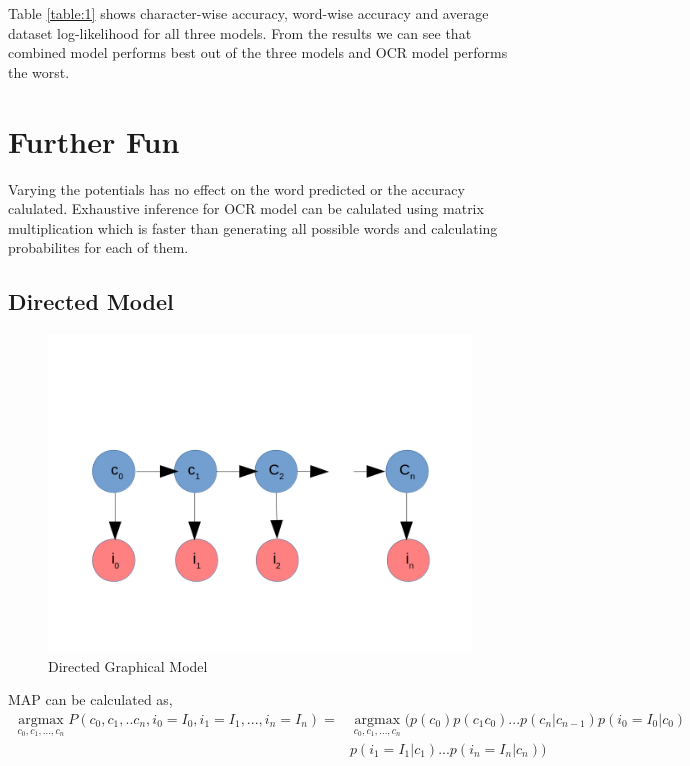 \documentclass[paper=a4, fontsize=11pt]{scrartcl} %
\DeclareMathOperator*{\argmax}{argmax}
\newcommand*{\argmaxl}{\argmax\limits}
\numberwithin{equation}{section} %
\numberwithin{figure}{section} %
\numberwithin{table}{section} %
\begin{document}
Table \ref{table:1} shows character-wise accuracy, word-wise accuracy and average dataset log-likelihood for all three models. From the results we can see that combined model performs best out of the three models and OCR model performs the worst.


\section{Further Fun}

\par

Varying the potentials has no effect on the word predicted or the accuracy calulated. Exhaustive inference for OCR model can be calulated using matrix multiplication which is faster than generating all possible words and calculating probabilites for each of them.

\subsection{Directed Model}

\begin{figure}[!ht]
	\centering
		\includegraphics[scale=0.4]{bnet}
		\caption{Directed Graphical Model}
\end{figure}

MAP can be calculated as,
\begin{align*}
	\argmaxl_{c_0,c_1,...,c_n} P(c_0,c_1,..c_n,i_0=I_0,i_1=I_1,...,i_n=I_n) = &\argmaxl_{c_0,c_1,...,c_n} \Big( p(c_0)p(c_1c_0)...p(c_n|c_{n-1})p(i_0=I_0|c_0) \\
	 																			&p(i_1=I_1|c_1)...p(i_n=I_n|c_n)\Big) \\
\end{align*}
\end{document}
